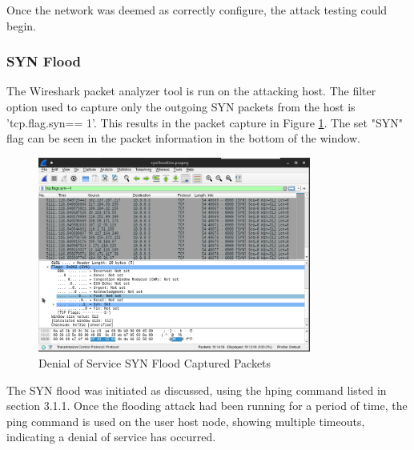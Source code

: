 Once the network was deemed as correctly configure, the attack testing could
begin.

\subsubsection{SYN Flood}

The Wireshark packet analyzer tool is run on the attacking host. The filter
option used to capture only the outgoing SYN packets from the host is
'tcp.flag.syn== 1'. This results in the packet capture in Figure
\ref{fig:images-synFloodDosWs}. The set "SYN" flag can be seen in the packet
information in the bottom of the window.

\begin{figure}[H]
	\centering
	\includegraphics[width=0.8\textwidth]{images/synFloodDosWs}
	\caption{Denial of Service SYN Flood Captured Packets}
	\label{fig:images-synFloodDosWs}
\end{figure}

The SYN flood was initiated as discussed, using the hping command listed in
section 3.1.1. Once the flooding attack had been running for a period of time,
the ping command is used on the user host node, showing multiple timeouts,
indicating a denial of service has occurred.

